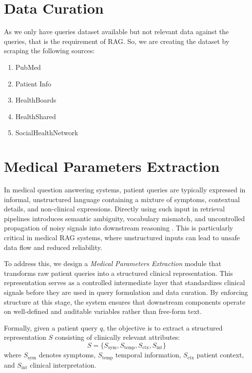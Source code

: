 \documentclass[conference, anonymous]{IEEEtran}
\begin{document}
\section{Data Curation}
As we only have queries dataset available but not relevant data against the queries, that is the requirement of RAG.
So, we are creating the dataset by scraping the following sources:
\begin{enumerate}
    \item PubMed
    \item Patient Info
    \item HealthBoards
    \item HealthShared
    \item SocialHealthNetwork
\end{enumerate}


\section{Medical Parameters Extraction}

In medical question answering systems, patient queries are typically expressed in informal, unstructured language containing a mixture of symptoms, contextual details, and non-clinical expressions. Directly using such input in retrieval pipelines introduces semantic ambiguity, vocabulary mismatch, and uncontrolled propagation of noisy signals into downstream reasoning \cite{demner2009nlp,trec2017}. This is particularly critical in medical RAG systems, where unstructured inputs can lead to unsafe data flow and reduced reliability.

To address this, we design a \textit{Medical Parameters Extraction} module that transforms raw patient queries into a structured clinical representation. This representation serves as a controlled intermediate layer that standardizes clinical signals before they are used in query formulation and data curation. By enforcing structure at this stage, the system ensures that downstream components operate on well-defined and auditable variables rather than free-form text.

Formally, given a patient query $q$, the objective is to extract a structured representation $S$ consisting of clinically relevant attributes:
\[
S = \{ S_{\text{sym}}, S_{\text{temp}}, S_{\text{ctx}}, S_{\text{int}} \} 
\]
where $S_{\text{sym}}$ denotes symptoms, $S_{\text{temp}}$ temporal information, $S_{\text{ctx}}$ patient context, and $S_{\text{int}}$ clinical interpretation.
\end{document}
